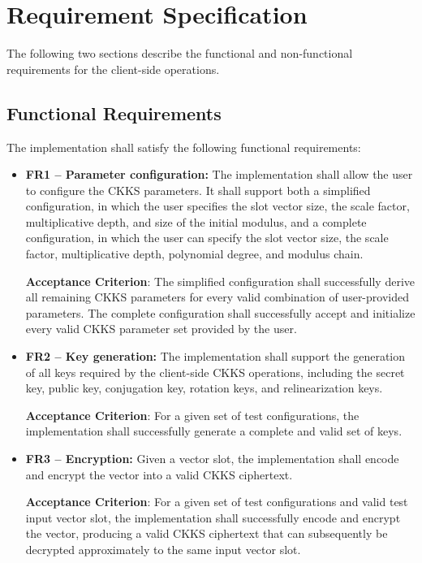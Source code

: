 \chapter{Requirement Specification} \label{cap:especificacao}

The following two sections describe the functional and non-functional requirements for the client-side operations.

\section{Functional Requirements}

The implementation shall satisfy the following functional requirements:

\begin{itemize}
\item \textbf{FR1 -- Parameter configuration:} The implementation shall allow the user to configure the CKKS parameters. It shall support both a simplified configuration, in which the user specifies the slot vector size, the scale factor, multiplicative depth, and size of the initial modulus, and a complete configuration, in which the user can specify the slot vector size, the scale factor, multiplicative depth, polynomial degree, and modulus chain.

    \textbf{Acceptance Criterion}: The simplified configuration shall successfully derive all remaining CKKS parameters for every valid combination of user-provided parameters. The complete configuration shall successfully accept and initialize every valid CKKS parameter set provided by the user.

\item \textbf{FR2 -- Key generation:} The implementation shall support the generation of all keys required by the client-side CKKS operations, including the secret key, public key, conjugation key, rotation keys, and relinearization keys.

    \textbf{Acceptance Criterion}: For a given set of test configurations, the implementation shall successfully generate a complete and valid set of keys.

\item \textbf{FR3 -- Encryption:} Given a vector slot, the implementation shall encode and encrypt the vector into a valid CKKS ciphertext.

    \textbf{Acceptance Criterion}: For a given set of test configurations and valid test input vector slot, the implementation shall successfully encode and encrypt the vector, producing a valid CKKS ciphertext that can subsequently be decrypted approximately to the same input vector slot.


\end{itemize}
